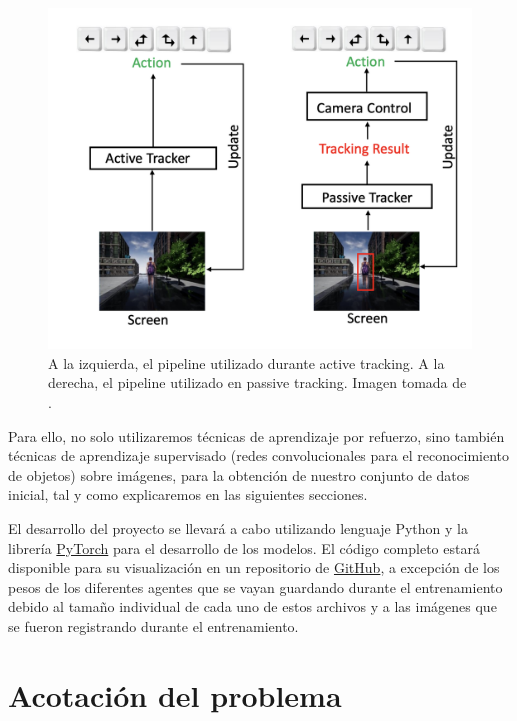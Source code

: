 \begin{figure}[ht!]
\centering
\includegraphics[scale=0.4]{figuras/active_tracking_vs_passive_tracking.png}
\caption[A la izquierda, el pipeline utilizado durante active tracking. A la derecha, el pipeline utilizado en passive tracking.]{A la izquierda, el pipeline utilizado durante active tracking. A la derecha, el pipeline utilizado en passive tracking. Imagen tomada de \citet{luo2019end}.}
\label{fig-active-tracking}
\end{figure}
\medskip

Para ello, no solo utilizaremos técnicas de aprendizaje por refuerzo, sino también técnicas de aprendizaje supervisado (redes convolucionales para el reconocimiento de objetos) sobre imágenes, para la obtención de nuestro conjunto de datos inicial, tal y como explicaremos en las siguientes secciones.
\medskip

El desarrollo del proyecto se llevará a cabo utilizando lenguaje Python y la librería \href{https://pytorch.org/}{PyTorch} para el desarrollo de los modelos. El código completo estará disponible para su visualización en un repositorio de \href{https://github.com/lucaswerner90/msc-degree-ai}{GitHub}, a excepción de los pesos de los diferentes agentes que se vayan guardando durante el entrenamiento debido al tamaño individual de cada uno de estos archivos y a las imágenes que se fueron registrando durante el entrenamiento.


\section{Acotación del problema}
\label{acotacion-del-problema}

